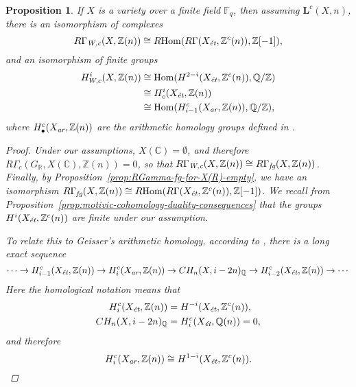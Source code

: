 \documentclass[leqno,12pt]{article}
\theoremstyle{plain}
\newtheorem{proposition}[theorem]{\indent\sc Proposition}
\theoremstyle{definition}
\DeclareMathOperator{\Hom}{Hom}
\newcommand{\CC}{\mathbb{C}}
\newcommand{\FF}{\mathbb{F}}
\newcommand{\QQ}{\mathbb{Q}}
\newcommand{\RR}{\mathbb{R}}
\newcommand{\ZZ}{\mathbb{Z}}
\newcommand{\Wc}{\text{\it W,c}}
\newcommand{\ar}{\text{\it ar}}
\newcommand{\et}{\text{\it \'{e}t}}
\newcommand{\fg}{\text{\it fg}}
\newcommand{\RHom}{R\!\Hom}
\begin{document}
\begin{proposition}
  If $X$ is a variety over a finite field $\FF_q$, then assuming
  $\mathbf{L}^c (X,n)$, there is an isomorphism of complexes
  \begin{equation}
    \label{eqn:RGamma-Wc-over-finite-fields}
    R\Gamma_\Wc (X,\ZZ(n)) \cong \RHom (R\Gamma (X_\et, \ZZ^c (n)), \ZZ [-1]),
  \end{equation}
  and an isomorphism of finite groups
  \begin{align*}
    H^i_{W,c} (X, \ZZ (n)) & \cong
                             \Hom (H^{2-i} (X_\et, \ZZ^c (n)), \QQ/\ZZ)\\
                           & \cong
                             H^i_c (X_\et, \ZZ(n)) \\
                           & \cong
                             \Hom (H_{i-1}^c (X_\ar, \ZZ (n)), \QQ/\ZZ),
  \end{align*}
  where $H_\bullet^c (X_\ar, \ZZ (n))$ are the arithmetic homology groups
  defined in {\rm \cite[\S 3]{Geisser-2010-arithmetic-homology}}.

  \begin{proof}
    Under our assumptions, $X (\CC) = \emptyset$, and therefore
    $R\Gamma_c (G_\RR, X (\CC), \ZZ (n)) = 0$, so that
    $R\Gamma_\Wc (X,\ZZ(n)) \cong R\Gamma_\fg (X, \ZZ (n))$. Finally, by
    Proposition~\ref{prop:RGamma-fg-for-X(R)-empty}, we have an isomorphism
    $R\Gamma_\fg (X, \ZZ (n)) \cong \RHom (R\Gamma (X_\et, \ZZ^c (n)), \ZZ
    [-1])$.  We recall from
    Proposition~\ref{prop:motivic-cohomology-duality-consequences} that the
    groups $H^i (X_\et, \ZZ^c(n))$ are finite under our assumption.

    To relate this to Geisser's arithmetic homology, according to
    \cite[Theorem~3.1]{Geisser-2010-arithmetic-homology}, there is a long exact
    sequence
    \[ \cdots \to H_{i-1}^c (X_\et, \ZZ (n)) \to
      H_i^c (X_\ar, \ZZ (n)) \to CH_n (X, i-2n)_\QQ \to
      H_{i-2}^c (X_\et, \ZZ (n)) \to \cdots \]
    Here the homological notation means that
    \begin{align*}
      H_i^c (X_\et, \ZZ (n)) & = H^{-i} (X_\et, \ZZ^c (n)), \\
      CH_n (X, i-2n)_\QQ & = H_i^c (X_\et, \QQ (n)) = 0,
    \end{align*}
    and therefore
    $$H_i^c (X_\ar, \ZZ (n)) \cong H^{1-i} (X_\et, \ZZ^c (n)).$$


\end{proof}
\end{proposition}
\end{document}
